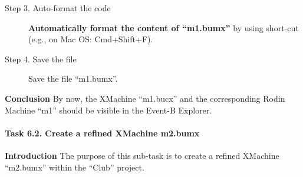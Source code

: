 \begin{description}
\item[Step 3. Auto-format the code] \textbf{Automatically format the content of ``m1.bumx''} by using short-cut (e.g., on Mac OS: Cmd+Shift+F).

\item[Step 4. Save the file] Save the file ``m1.bumx''.
\end{description}

\textbf{Conclusion} By now, the XMachine ``m1.bucx'' and the corresponding Rodin Machine ``m1'' should be visible in the Event-B Explorer.

\paragraph{Task 6.2. Create a refined XMachine m2.bumx}
\textbf{Introduction} The purpose of this sub-task is to create a refined XMachine ``m2.bumx'' within the ``Club'' project.

